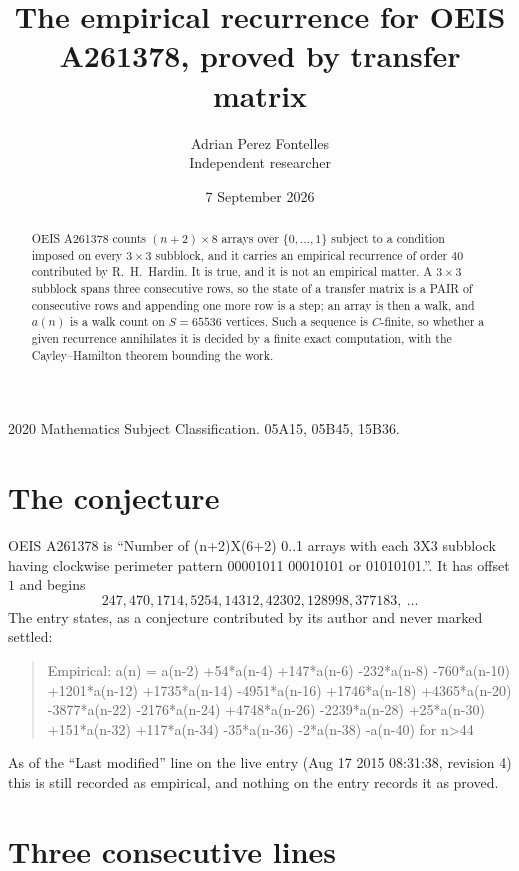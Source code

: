 \documentclass[11pt,a4paper]{article}
\title{The empirical recurrence for OEIS A261378, proved by transfer matrix}
\author{Adrian Perez Fontelles\\ \small Independent researcher}
\date{7 September 2026}
\theoremstyle{plain}
\theoremstyle{definition}
\begin{document}
\maketitle

\begin{abstract}
OEIS A261378 counts $(n+2)\times8$ arrays over $\{0,\dots,1\}$ subject to a condition imposed on
every $3\times3$ subblock, and it carries an empirical recurrence of order $40$
contributed by R.~H.~Hardin. It is true, and it is not an empirical matter. A $3\times3$
subblock spans three consecutive rows, so the state of a transfer matrix is a PAIR of
consecutive rows and appending one more row is a step; an array is then a walk, and
$a(n)$ is a walk count on $S=65536$ vertices. Such a sequence is $C$-finite, so whether a given
recurrence annihilates it is decided by a finite exact computation, with the Cayley--Hamilton
theorem bounding the work.
\end{abstract}

\noindent\small 2020 Mathematics Subject Classification. 05A15, 05B45, 15B36.\normalsize

\section{The conjecture}

OEIS A261378 is ``Number of (n+2)X(6+2) 0..1 arrays with each 3X3 subblock having clockwise perimeter pattern 00001011 00010101 or 01010101.''. It has offset $1$ and begins
\[
247, 470, 1714, 5254, 14312, 42302, 128998, 377183,\ \dots
\]
The entry states, as a conjecture contributed by its author and never marked settled:
\begin{quote}
Empirical: a(n) = a(n-2) +54*a(n-4) +147*a(n-6) -232*a(n-8) -760*a(n-10) +1201*a(n-12) +1735*a(n-14) -4951*a(n-16) +1746*a(n-18) +4365*a(n-20) -3877*a(n-22) -2176*a(n-24) +4748*a(n-26) -2239*a(n-28) +25*a(n-30) +151*a(n-32) +117*a(n-34) -35*a(n-36) -2*a(n-38) -a(n-40) for n>44
\end{quote}
As of the ``Last modified'' line on the live entry (Aug 17 2015 08:31:38, revision 4) this is still
recorded as empirical, and nothing on the entry records it as proved.

\section{Three consecutive lines}
\end{document}
